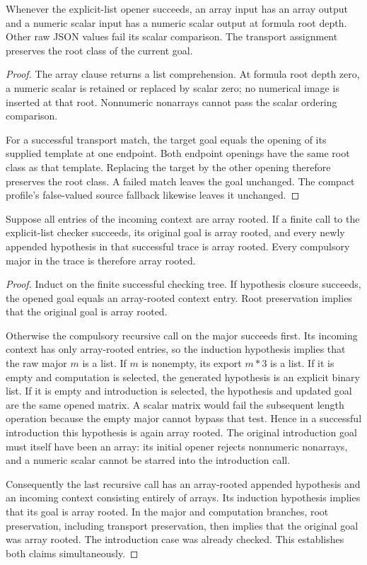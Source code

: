\begin{lemma}
Whenever the explicit-list opener succeeds, an array input has an array
output and a numeric scalar input has a numeric scalar output at formula
root depth.  Other raw JSON values fail its scalar comparison.
The transport assignment preserves the root class of the current goal.
\end{lemma}
\begin{proof}
The array clause returns a list comprehension.  At formula root depth
zero, a numeric scalar is retained or replaced by scalar zero; no numerical
image is inserted at that root.  Nonnumeric nonarrays cannot pass the
scalar ordering comparison.

For a successful transport match, the target goal equals the opening
of its supplied template at one endpoint.  Both endpoint openings have
the same root class as that template.  Replacing the target by the other
opening therefore preserves the root class. A failed match leaves the
goal unchanged. The compact profile's false-valued source fallback
likewise leaves it unchanged.
\end{proof}

\begin{lemma}
\label{lem:successful-array-invariant}
Suppose all entries of the incoming context are array rooted.  If a
finite call to the explicit-list checker succeeds, its original goal
is array rooted, and every newly appended hypothesis in that successful
trace is array rooted.  Every compulsory major in the trace is
therefore array rooted.
\end{lemma}
\begin{proof}
Induct on the finite successful checking tree.  If hypothesis closure
succeeds, the opened goal equals an array-rooted context entry.  Root
preservation implies that the original goal is array rooted.

Otherwise the compulsory recursive call on the major succeeds first.
Its incoming context has only array-rooted entries, so the induction
hypothesis implies that the raw major $m$ is a list.  If $m$ is nonempty,
its export $m*3$ is a list.  If it is empty and computation is selected,
the generated hypothesis is an explicit binary list.  If it is empty
and introduction is selected, the hypothesis and updated goal are the
same opened matrix.  A scalar matrix would fail the subsequent length
operation because the empty major cannot bypass that test.  Hence in
a successful introduction this hypothesis is again array rooted.
The original introduction goal must itself have been an array: its
initial opener rejects nonnumeric nonarrays, and a numeric scalar
cannot be starred into the introduction call.

Consequently the last recursive call has an array-rooted appended
hypothesis and an incoming context consisting entirely of arrays.
Its induction hypothesis implies that its goal is array rooted.
In the major and computation branches, root preservation, including
transport preservation, then implies that the original goal was array
rooted.  The introduction case was already checked.  This establishes
both claims simultaneously.
\end{proof}

